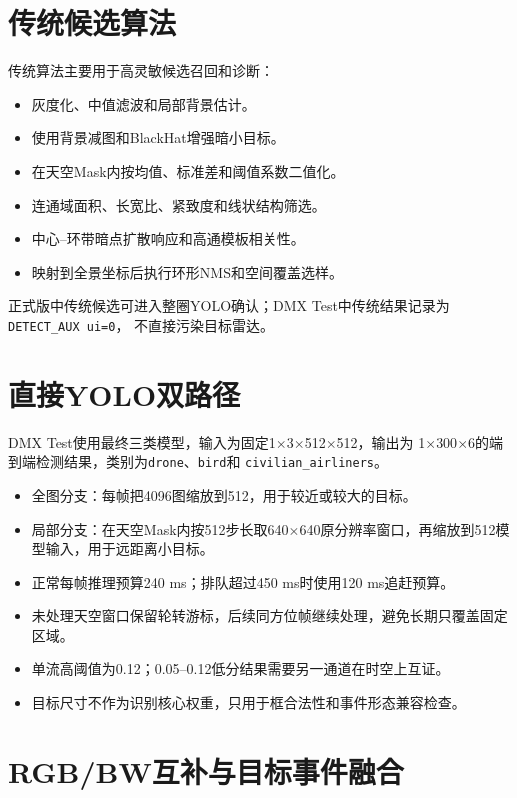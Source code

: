 \documentclass[UTF8,a4paper,11pt,openany]{ctexrep}
\begin{document}
\section{传统候选算法}

传统算法主要用于高灵敏候选召回和诊断：

\begin{itemize}
  \item 灰度化、中值滤波和局部背景估计。
  \item 使用背景减图和BlackHat增强暗小目标。
  \item 在天空Mask内按均值、标准差和阈值系数二值化。
  \item 连通域面积、长宽比、紧致度和线状结构筛选。
  \item 中心--环带暗点扩散响应和高通模板相关性。
  \item 映射到全景坐标后执行环形NMS和空间覆盖选样。
\end{itemize}

正式版中传统候选可进入整圈YOLO确认；DMX Test中传统结果记录为\texttt{DETECT\_AUX ui=0}，
不直接污染目标雷达。

\section{直接YOLO双路径}

DMX Test使用最终三类模型，输入为固定1$\times$3$\times$512$\times$512，输出为
1$\times$300$\times$6的端到端检测结果，类别为\texttt{drone}、\texttt{bird}和
\texttt{civilian\_airliners}。

\begin{itemize}
  \item 全图分支：每帧把4096图缩放到512，用于较近或较大的目标。
  \item 局部分支：在天空Mask内按512步长取640$\times$640原分辨率窗口，再缩放到512模型输入，用于远距离小目标。
  \item 正常每帧推理预算240 ms；排队超过450 ms时使用120 ms追赶预算。
  \item 未处理天空窗口保留轮转游标，后续同方位帧继续处理，避免长期只覆盖固定区域。
  \item 单流高阈值为0.12；0.05--0.12低分结果需要另一通道在时空上互证。
  \item 目标尺寸不作为识别核心权重，只用于框合法性和事件形态兼容检查。
\end{itemize}

\section{RGB/BW互补与目标事件融合}
\end{document}
